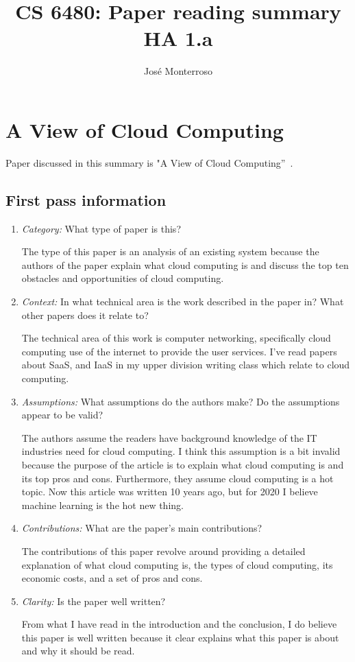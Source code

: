 \documentclass[letterpaper,twocolumn,10pt]{article}
\title{CS 6480: Paper reading summary\\
HA 1.a\\}
\author{José Monterroso}
\affil{School of Computing, University of Utah}
\begin{document}
\maketitle

\section{A View of Cloud Computing }

Paper discussed in this summary is "A View of Cloud Computing''~\cite{aview}.

\subsection{First pass information}
\label{sec:first}

\begin{enumerate}

\item {\it Category:} What type of paper is this?

The type of this paper is an analysis of an existing system because the authors of the paper explain what cloud computing is and discuss the top ten obstacles and opportunities of cloud computing. 


\item {\it Context:} In what technical area is the work described in the paper in? What other papers does it relate to? 

The technical area of this work is computer networking, specifically cloud computing use of the internet to provide the user services.
I've read papers about SaaS, and IaaS in my upper division writing class which relate to cloud computing. 

\item {\it Assumptions:}  What assumptions do the authors make? Do the assumptions appear to be valid?

The authors assume the readers have background knowledge of the IT industries need for cloud computing. I think this assumption is a bit invalid because the purpose of the article is to explain what cloud computing is and its top pros and cons. Furthermore, they assume cloud computing is a hot topic. Now this article was written 10 years ago, but for 2020 I believe machine learning is the hot new thing. 

\item {\it Contributions:} What are the paper's main contributions?

The contributions of this paper revolve around providing a detailed explanation of what cloud computing is, the types of cloud computing, its economic costs, and a set of pros and cons. 

\item {\it Clarity:} Is the paper well written?

From what I have read in the introduction and the conclusion, I do believe this paper is well written because it clear explains what this paper is about and why it should be read. 

\end{enumerate}
\end{document}
